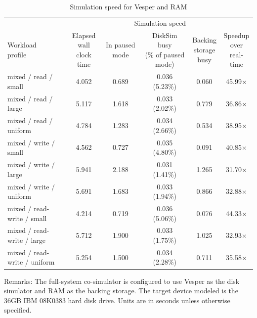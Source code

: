 \begin{table}[htbp]%
	\small
	\begin{center}
	\caption{Simulation speed for Vesper and RAM}\label{tab:Vesper-and-RAM-speed}
	\hspace*{-2cm}
	\noindent\begin{tabular}{lccccc}
		\toprule
		& \multicolumn{5}{c}{Simulation speed} \\
		\cmidrule(lr){2-6}
		\parbox{3cm}{\centering Workload \\ profile} & \parbox{1.8cm}{\centering Elapsed \\ wall clock \\ time } & \parbox{1.2cm}{\centering In paused mode } & \parbox{3.2cm}{\centering DiskSim busy \\ (\% of paused mode)} & \parbox{1.2cm}{\centering Backing \\ storage \\ busy} & \parbox{1.5cm}{\centering Speedup \\ over \\ real-time}\\
		
		\midrule
		
		mixed / read / small & 4.052 & 0.689 & 0.036 (5.23\%) & 0.060 & 45.99$\times$ \\
		mixed / read / large & 5.117 & 1.618 & 0.033 (2.02\%) & 0.779 & 36.86$\times$ \\
		mixed / read / uniform & 4.784 & 1.283 & 0.034 (2.66\%) & 0.534 & 38.95$\times$ \\
		mixed / write / small & 4.562 & 0.727 & 0.035 (4.80\%) & 0.091 & 40.85$\times$ \\
		mixed / write / large & 5.941 & 2.188 & 0.031 (1.41\%) & 1.265 & 31.70$\times$ \\
		mixed / write / uniform & 5.691 & 1.683 & 0.033 (1.94\%) & 0.866 & 32.88$\times$ \\
		mixed / read-write / small & 4.214 & 0.719 & 0.036 (5.06\%) & 0.076 & 44.33$\times$ \\
		mixed / read-write / large & 5.712 & 1.900 & 0.033 (1.75\%) & 1.025 & 32.93$\times$ \\
		mixed / read-write / uniform & 5.254 & 1.500 & 0.034 (2.28\%) & 0.711 & 35.58$\times$\\
		
		\bottomrule
	\end{tabular} 
	\hspace*{-2cm}
	\end{center}

	Remarks: The full-system co-simulator is configured to use Vesper as the disk simulator and RAM as the backing storage. The target device modeled is the 36GB IBM 08K0383 hard disk drive. Units are in seconds unless otherwise specified.
\end{table}%


